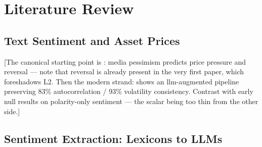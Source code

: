 %
%
%
%
\chapter{Literature Review}
\label{ch:literature}

\section{Text Sentiment and Asset Prices}
\label{sec:lit-sentiment-prices}

[The canonical starting point is \textcite{tetlock2007}: media
pessimism predicts price pressure and reversal --- note that reversal
is already present in the very first paper, which foreshadows L2.
Then the modern strand: \textcite{mitic2026llm} shows an
\gls{llm}-augmented pipeline preserving 83\% autocorrelation / 93\%
volatility consistency. Contrast with early null results on
polarity-only sentiment --- the scalar being too thin from the other
side.]

\section{Sentiment Extraction: Lexicons to LLMs}
\label{sec:lit-extraction}

